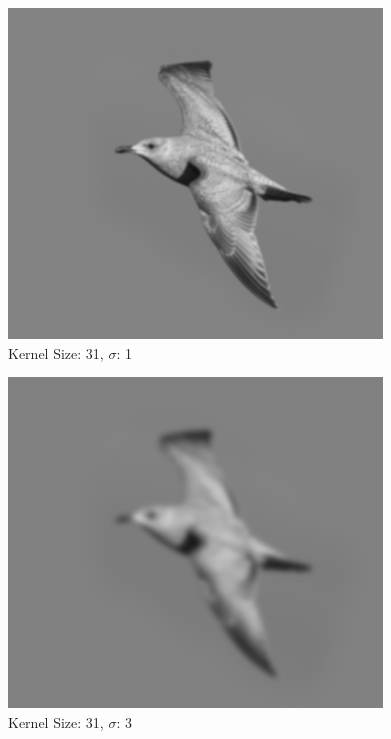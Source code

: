 \documentclass{article}
\begin{document}
\begin{minipage}{\linewidth}
    \centering
    \begin{minipage}{0.45\linewidth}
        \begin{figure}[H]
			\includegraphics[width=\linewidth]{Ejercicio1a/gaussiana(31,31)1.png} 
            \caption{Kernel Size: 31, $\sigma$: 1}
        \end{figure}
    \end{minipage}
    \hspace{0.05\linewidth}
    \begin{minipage}{0.45\linewidth}
        \begin{figure}[H]
            \includegraphics[width=\linewidth]{Ejercicio1a/gaussiana(31,31)3.png}
            \caption{Kernel Size: 31, $\sigma$: 3}
        \end{figure}
    \end{minipage}
    

\end{minipage}
\end{document}
